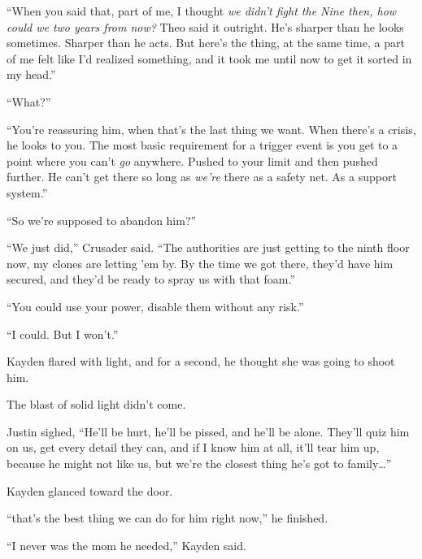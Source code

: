 ``When you said that, part of me, I thought \emph{we didn't fight the Nine then, how could we two years from now?  }Theo said it outright.  He's sharper than he looks sometimes.  Sharper than he acts.  But here's the thing, at the same time, a part of me felt like I'd realized something, and it took me until now to get it sorted in my head.''



``What?''



``You're reassuring him, when that's the last thing we want.  When there's a crisis, he looks to you.  The most basic requirement for a trigger event is you get to a point where you can't \emph{go} anywhere.  Pushed to your limit and then pushed further.  He can't get there so long as \emph{we're} there as a safety net.  As a support system.''



``So we're supposed to abandon him?''



``We just did,'' Crusader said.  ``The authorities are just getting to the ninth floor now, my clones are letting 'em by.  By the time we got there, they'd have him secured, and they'd be ready to spray us with that foam.''



``You could use your power, disable them without any risk.''



``I could.  But I won't.''



Kayden flared with light, and for a second, he thought she was going to shoot him.



The blast of solid light didn't come.



Justin sighed, ``He'll be hurt, he'll be pissed, and he'll be alone.  They'll quiz him on us, get every detail they can, and if I know him at all, it'll tear him up, because he might not like us, but we're the closest thing he's got to family\ldots''



Kayden glanced toward the door.



``\ldotsAnd that's the best thing we can do for him right now,'' he finished.



``I never was the mom he needed,'' Kayden said.




